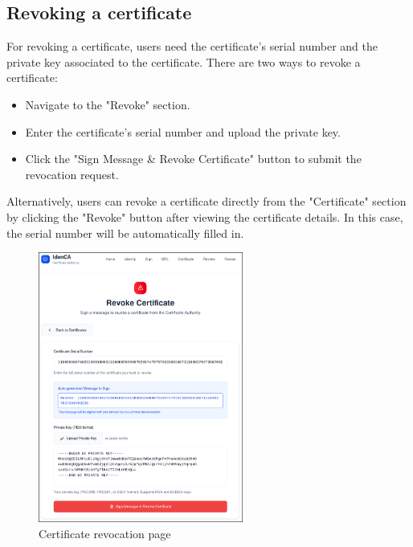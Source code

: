 \subsection{Revoking a certificate}
For revoking a certificate, users need the certificate's serial number and the private key 
associated to the certificate. There are two ways to revoke a certificate:
\begin{itemize}
    \item Navigate to the "Revoke" section.
    \item Enter the certificate's serial number and upload the private key.
    \item Click the "Sign Message \& Revoke Certificate" button to submit the revocation request.
\end{itemize}
Alternatively, users can revoke a certificate directly from the "Certificate" section by 
clicking the "Revoke" button after viewing the certificate details.
In this case, the serial number will be automatically filled in.
\begin{figure}[h!]
    \centering
    \includegraphics[keepaspectratio, width=0.6\textwidth]{Pic/9_revoke_certificate.png}
    \caption{Certificate revocation page}
    \label{fig:revocation-flow}
\end{figure}

